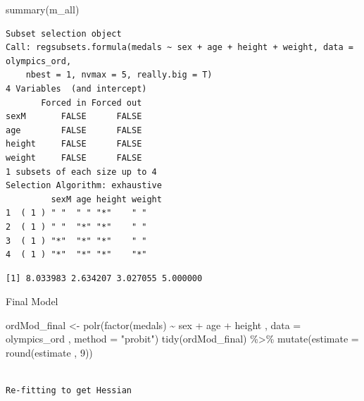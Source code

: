 \documentclass[
  letterpaper,
  DIV=11,
  numbers=noendperiod]{scrartcl}
\newenvironment{Shaded}{\begin{snugshade}}{\end{snugshade}}
\newcommand{\AttributeTok}[1]{\textcolor[rgb]{0.40,0.45,0.13}{#1}}
\newcommand{\DecValTok}[1]{\textcolor[rgb]{0.68,0.00,0.00}{#1}}
\newcommand{\FunctionTok}[1]{\textcolor[rgb]{0.28,0.35,0.67}{#1}}
\newcommand{\NormalTok}[1]{\textcolor[rgb]{0.00,0.23,0.31}{#1}}
\newcommand{\OtherTok}[1]{\textcolor[rgb]{0.00,0.23,0.31}{#1}}
\newcommand{\SpecialCharTok}[1]{\textcolor[rgb]{0.37,0.37,0.37}{#1}}
\newcommand{\StringTok}[1]{\textcolor[rgb]{0.13,0.47,0.30}{#1}}
\begin{document}
\begin{Shaded}
\begin{Highlighting}[]
\FunctionTok{summary}\NormalTok{(m\_all)}
\end{Highlighting}
\end{Shaded}

\begin{verbatim}
Subset selection object
Call: regsubsets.formula(medals ~ sex + age + height + weight, data = olympics_ord, 
    nbest = 1, nvmax = 5, really.big = T)
4 Variables  (and intercept)
       Forced in Forced out
sexM       FALSE      FALSE
age        FALSE      FALSE
height     FALSE      FALSE
weight     FALSE      FALSE
1 subsets of each size up to 4
Selection Algorithm: exhaustive
         sexM age height weight
1  ( 1 ) " "  " " "*"    " "   
2  ( 1 ) " "  "*" "*"    " "   
3  ( 1 ) "*"  "*" "*"    " "   
4  ( 1 ) "*"  "*" "*"    "*"   
\end{verbatim}

\begin{Shaded}
\end{Shaded}

\begin{verbatim}
[1] 8.033983 2.634207 3.027055 5.000000
\end{verbatim}

Final Model

\begin{Shaded}
\begin{Highlighting}[]
\NormalTok{ordMod\_final }\OtherTok{\textless{}{-}}
  \FunctionTok{polr}\NormalTok{(}\FunctionTok{factor}\NormalTok{(medals) }\SpecialCharTok{\textasciitilde{}}\NormalTok{ sex  }\SpecialCharTok{+}\NormalTok{ age }\SpecialCharTok{+}\NormalTok{ height , }\AttributeTok{data =}\NormalTok{ olympics\_ord , }\AttributeTok{method =} \StringTok{"probit"}\NormalTok{)}
\FunctionTok{tidy}\NormalTok{(ordMod\_final) }\SpecialCharTok{\%\textgreater{}\%}
  \FunctionTok{mutate}\NormalTok{(}\AttributeTok{estimate =} \FunctionTok{round}\NormalTok{(estimate , }\DecValTok{9}\NormalTok{))}
\end{Highlighting}
\end{Shaded}

\begin{verbatim}

Re-fitting to get Hessian
\end{verbatim}
\end{document}
